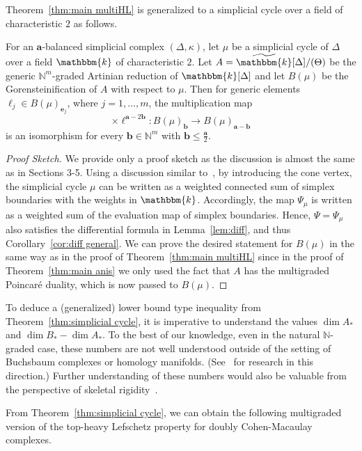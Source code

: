 Theorem~\ref{thm:main multiHL} is generalized to a simplicial cycle over a field of characteristic $2$ as follows.
\begin{theorem} \label{thm:simplicial cycle}
For an $\bm{a}$-balanced simplicial complex $(\Delta,\kappa)$, let $\mu$ be a simplicial cycle of $\Delta$ over a field $\mathbbm{k}$ of characteristic $2$.
Let $A=\widetilde{\mathbbm{k}}[\Delta]/(\Theta)$ be the generic $\mathbb{N}^m$-graded Artinian reduction of $\mathbbm{k}[\Delta]$ and let $B(\mu)$ be the Gorensteinification of $A$ with respect to $\mu$.
Then for generic elements $\ell_j \in B(\mu)_{\bm{e}_j}$, where $j=1,\ldots,m$, the multiplication map
\[
\times \bm{\ell}^{\bm{a}-2\bm{b}}: B(\mu)_{\bm{b}} \rightarrow B(\mu)_{\bm{a}-\bm{b}}
\]
is an isomorphism for every $\bm{b}\in\mathbb{N}^m$ with $\bm{b} \leq \frac{\bm{a}}{2}$.
\end{theorem}
\begin{proof}[Proof Sketch]
We provide only a proof sketch as the discussion is almost the same as in Sections 3-5.
Using a discussion similar to~\cite[Section 2.6]{KX}, by introducing the cone vertex, the simplicial cycle $\mu$ can be written as a weighted connected sum of simplex boundaries with the weights in $\mathbbm{k}$.
Accordingly, the map $\Psi_\mu$ is written as a weighted sum of the evaluation map of simplex boundaries. 
Hence, $\Psi=\Psi_\mu$ also satisfies the differential formula in Lemma~\ref{lem:diff}, and thus Corollary~\ref{cor:diff general}.
We can prove the desired statement for $B(\mu)$ in the same way as in the proof of Theorem~\ref{thm:main multiHL} since in the proof of Theorem~\ref{thm:main anis} we only used the fact that $A$ has the multigraded Poincar\'{e} duality, which is now passed to $B(\mu)$.
\end{proof}
\begin{rema}
To deduce a (generalized) lower bound type inequality from Theorem~\ref{thm:simplicial cycle}, it is imperative to understand the values $\dim A_*$ and $\dim B_*-\dim A_*$.
To the best of our knowledge, even in the natural $\mathbb{N}$-graded case, these numbers are not well understood outside of the setting of Buchsbaum complexes or homology manifolds. 
(See~\cite{Fog,Mu,NS12,NS20,Oba} for research in this direction.)
Further understanding of these numbers would also be valuable from the perspective of skeletal rigidity~\cite{TW}.
\end{rema}
From Theorem~\ref{thm:simplicial cycle}, we can obtain the following multigraded version of the top-heavy Lefschetz property for doubly Cohen-Macaulay complexes.
